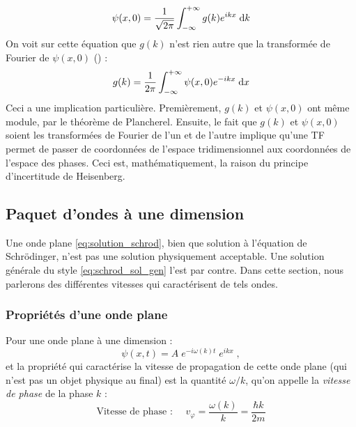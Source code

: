 \documentclass[12pt, a4paper]{book}
\begin{document}
$$\psi(x,0) = \dfrac{1}{\sqrt{2\pi}} \int_{-\infty} ^{+\infty} g(k) e^{ikx} \; \mathrm{d} k $$
On voit sur cette équation que $g(k)$ n'est rien autre que la transformée de Fourier de $\psi(x,0)$ ({\color{blue}{voir annexe sur notions de math}}) :
$$g(k) = \frac{1}{2 \pi}\int_{-\infty} ^{+\infty} \psi(x,0) e^{-ikx} \; \mathrm{d} x $$
Ceci a une implication particulière. Premièrement, $g(k)$ et $\psi(x,0)$ ont même module, par le théorème de Plancherel. Ensuite, le fait que $g(k)$ et $\psi(x,0)$ soient les transformées de Fourier de l'un et de l'autre implique qu'une TF permet de passer de coordonnées de l'espace tridimensionnel aux coordonnées de l'espace des phases. Ceci est, mathématiquement, la raison du principe d'incertitude de Heisenberg.{\color{blue}{Perso j'enlèverai tout ce dernier paragraphe. 
Je trouve que ça n'aide pas beaucoup à la compréhension de parler de l'espace des phases. De plus, pour comprendre que c'est à la base du principe d'Heisenberg, j'ai été lire dans le cohen, ça fait l'objet de plusieurs pages donc à moins qu'on développe un peu plus, on ne comprend pas trop juste cette phrase.}}


\subsection{Paquet d'ondes à une dimension}
Une onde plane \eqref{eq:solution_schrod}, bien que solution à l'équation de Schrödinger, n'est pas une solution physiquement acceptable. Une solution générale du style \eqref{eq:schrod_sol_gen} l'est par contre. 
Dans cette section, nous parlerons des différentes vitesses qui caractérisent de tels ondes. 
\subsubsection{Propriétés d'une onde plane}
Pour une onde plane à une dimension :
$$\psi(x,t) = A \; e^{-i\omega(k) t} \; e ^{ikx} \; ,$$
et la propriété qui caractérise la vitesse de propagation de cette onde plane (qui n'est pas un objet physique au final) est la quantité $\omega/k$, qu'on appelle la \textit{vitesse de phase} de la phase $k$ :
\begin{equation}
\text{Vitesse de phase : } \quad v_\varphi = \dfrac{\omega(k)}{k} = \dfrac{\hbar k}{2m}
\end{equation}
\end{document}
